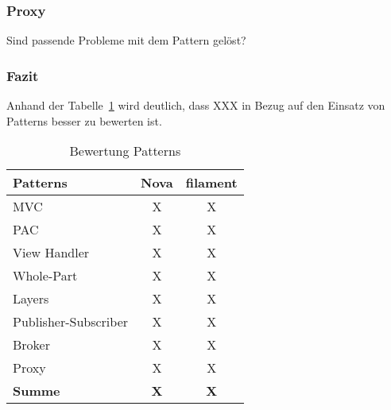 \subsubsection{Proxy}
Sind passende Probleme mit dem Pattern gelöst?

\subsubsection{Fazit}
Anhand der Tabelle~\ref{tab:bewertung-patterns} wird deutlich, dass XXX in Bezug auf den Einsatz von Patterns besser zu bewerten ist.

\begin{table}[]
    \caption{Bewertung Patterns}
    \label{tab:bewertung-patterns}
    \centering
    \begin{tabular}{|l|c|c|}
        \hline
        \textbf{Patterns}    & \textbf{Nova} & \textbf{filament} \\ \hline
        MVC                  & X             & X                 \\ \hline
        PAC                  & X             & X                 \\ \hline
        View Handler         & X             & X                 \\ \hline
        Whole-Part           & X             & X                 \\ \hline
        Layers               & X             & X                 \\ \hline
        Publisher-Subscriber & X             & X                 \\ \hline
        Broker               & X             & X                 \\ \hline
        Proxy                & X             & X                 \\ \hline
        \textbf{Summe}       & \textbf{X}    & \textbf{X}        \\ \hline
    \end{tabular}
\end{table}

\color{black}
